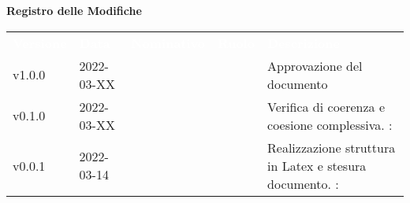 

{\LARGE{\textbf{Registro delle Modifiche}}} \\
\begin{table}[!htbp]
	\renewcommand{\arraystretch}{1.5}
	\begin{tabular}{ m{}<{\centering}  m{}<{\centering}  m{}<{\centering}  m{}<{\centering}  m{}<{\centering} }
		\rowcolor{darkblue}
		\textcolor{white}{\textbf{Versione}} & \textcolor{white}{\textbf{Data}} & \textcolor{white}{\textbf{Nominativo}} & \textcolor{white}{\textbf{Ruolo}} & \textcolor{white}{\textbf{Descrizione}}                              \\
		v1.0.0                               & 2022-03-XX                       &                                        & \RE                               & Approvazione del documento                                           \\

		v0.1.0                               & 2022-03-XX                       & \PV                                    & \AN                               & Verifica di coerenza e coesione complessiva. \VE: \textit{}          \\

		v0.0.1                               & 2022-03-14                       & \PV                                    & \AN                               & Realizzazione struttura in Latex e stesura documento. \VE: \textit{} \\
	\end{tabular}
\end{table}

\pagebreak